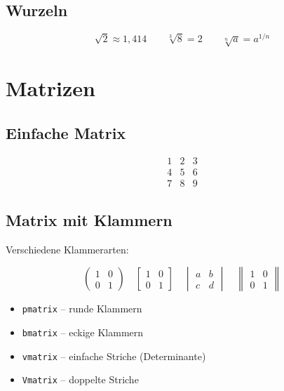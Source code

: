 \section{Wurzeln}

\[
    \sqrt{2} \approx 1{,}414 \qquad
    \sqrt[3]{8} = 2 \qquad
    \sqrt[n]{a} = a^{1/n}
\]

\chapter{Matrizen}
\label{sec:matrizen}

\section{Einfache Matrix}

\[
    \begin{matrix}
        1 & 2 & 3 \\
        4 & 5 & 6 \\
        7 & 8 & 9
    \end{matrix}
\]

\section{Matrix mit Klammern}

Verschiedene Klammerarten:

\[
    \begin{pmatrix} 1 & 0 \\ 0 & 1 \end{pmatrix}
    \quad
    \begin{bmatrix} 1 & 0 \\ 0 & 1 \end{bmatrix}
    \quad
    \begin{vmatrix} a & b \\ c & d \end{vmatrix}
    \quad
    \begin{Vmatrix} 1 & 0 \\ 0 & 1 \end{Vmatrix}
\]

\begin{itemize}
    \item \texttt{pmatrix} -- runde Klammern
    \item \texttt{bmatrix} -- eckige Klammern
    \item \texttt{vmatrix} -- einfache Striche (Determinante)
    \item \texttt{Vmatrix} -- doppelte Striche
\end{itemize}

